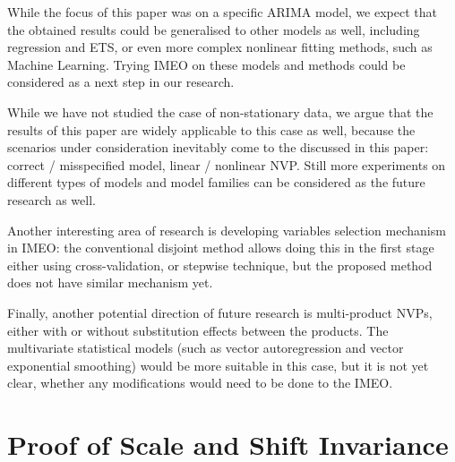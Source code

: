 \documentclass{article}
\begin{document}
While the focus of this paper was on a specific ARIMA model, we expect that the obtained results could be generalised to other models as well, including regression and ETS, or even more complex nonlinear fitting methods, such as Machine Learning. Trying IMEO on these models and methods could be considered as a next step in our research.

While we have not studied the case of non-stationary data, we argue that the results of this paper are widely applicable to this case as well, because the scenarios under consideration inevitably come to the discussed in this paper: correct / misspecified model, linear / nonlinear NVP. Still more experiments on different types of models and model families can be considered as the future research as well.

Another interesting area of research is developing variables selection mechanism in IMEO: the conventional disjoint method allows doing this in the first stage either using cross-validation, or stepwise technique, but the proposed method does not have similar mechanism yet.

Finally, another potential direction of future research is multi-product NVPs, either with or without substitution effects between the products. The multivariate statistical models (such as vector autoregression and vector exponential smoothing) would be more suitable in this case, but it is not yet clear, whether any modifications would need to be done to the IMEO.


\appendix

\section{Proof of Scale and Shift Invariance}
\label{app:A}
\end{document}
